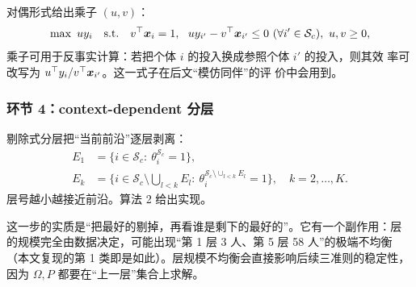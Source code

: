 对偶形式给出乘子 $(u,v)$：
\begin{equation}
\max\ uy_i\quad\text{s.t.}\quad v^{\top}\bm{x}_i=1,\ \
uy_{i'}-v^{\top}\bm{x}_{i'}\le 0\ (\forall i'\in\mathcal{S}_c),\ u,v\ge 0,
\label{eq:multiplier}
\end{equation}
乘子可用于反事实计算：若把个体 $i$ 的投入换成参照个体 $i'$ 的投入，则其效
率可改写为 $u^{\top}y_i/v^{\top}\bm{x}_{i'}$。这一式子在后文“模仿同伴”的评
价中会用到。

\subsubsection{环节 4：context-dependent 分层}

剔除式分层把“当前前沿”逐层剥离：
\begin{equation}
\begin{aligned}
E_1&=\bigl\{i\in\mathcal{S}_c:\ \theta_i^{\mathcal{S}_c}=1\bigr\},\\
E_{k}&=\bigl\{i\in\mathcal{S}_c\setminus\textstyle\bigcup_{l<k}E_l:\
\theta_i^{\mathcal{S}_c\setminus\cup_{l<k}E_l}=1\bigr\},\quad k=2,\dots,K .
\end{aligned}
\label{eq:layer}
\end{equation}
层号越小越接近前沿。算法 2 给出实现。

\begin{center}
\end{center}

这一步的实质是“把最好的剔掉，再看谁是剩下的最好的”。它有一个副作用：层
的规模完全由数据决定，可能出现“第 1 层 3 人、第 5 层 58 人”的极端不均衡
（本文复现的第 1 类即是如此）。层规模不均衡会直接影响后续三准则的稳定性，
因为 $\Omega,P$ 都要在“上一层”集合上求解。

